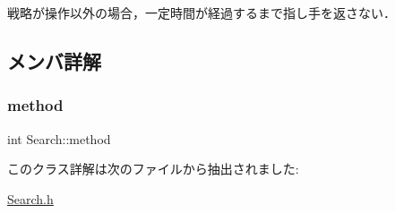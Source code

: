 戦略が操作以外の場合，一定時間が経過するまで指し手を返さない． 

\subsection{メンバ詳解}
\mbox{\label{class_search_a054d85756a7f57fe3e36ced2f91fd059}} 
\subsubsection{\texorpdfstring{method}{method}}
{\footnotesize\ttfamily int Search\+::method}



このクラス詳解は次のファイルから抽出されました\+:\begin{DoxyCompactItemize}
\item 
\mbox{\hyperlink{_search_8h}{Search.\+h}}\end{DoxyCompactItemize}
